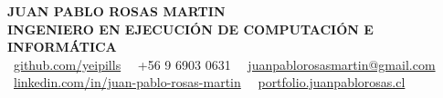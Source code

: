 \documentclass[10pt, letterpaper]{article}
\begin{document}
\pagestyle{empty}

\begin{center}
    {\color{primario}\Large\textbf{JUAN PABLO ROSAS MARTIN}}\\[0.05cm]
    {\color{primario}\small\textbf{INGENIERO EN EJECUCIÓN DE COMPUTACIÓN E INFORMÁTICA}}\\[0.15cm]
    
    \footnotesize
    \raisebox{-0.6pt}{\textcolor{primario}{\faGithub}}~\href{https://github.com/yeipills}{github.com/yeipills}~
    \raisebox{-0.6pt}{\textcolor{primario}{\faMobile}}~+56 9 6903 0631~
    \raisebox{-0.6pt}{\textcolor{primario}{\faEnvelope}}~\href{mailto:juanpablorosasmartin@gmail.com}{juanpablorosasmartin@gmail.com}\\[0.05cm]
    \raisebox{-0.6pt}{\textcolor{primario}{\faLinkedin}}~\href{https://linkedin.com/in/juan-pablo-rosas-martin}{linkedin.com/in/juan-pablo-rosas-martin}~
    \raisebox{-0.6pt}{\textcolor{primario}{\faGlobe}}~\href{https://portfolio.juanpablorosas.cl}{portfolio.juanpablorosas.cl}
\end{center}
\end{document}
